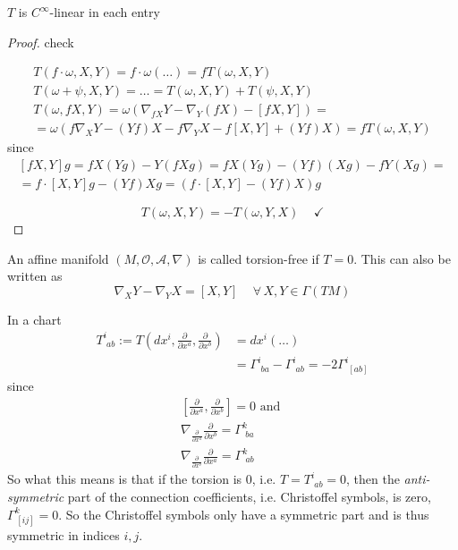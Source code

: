 \begin{theorem}
$T$ is $C^{\infty}$-linear in each entry
\end{theorem}

\begin{proof}
	check 
	
	\[
	\begin{gathered}
		T(f\cdot \omega, X, Y) = f\cdot \omega(\dots) = fT(\omega, X, Y) \\
		T(\omega + \psi, X, Y) = \dots = T(\omega, X, Y) + T(\psi, X, Y) \\
		T(\omega, fX, Y) = \omega( \nabla_{fX} Y - \nabla_Y (fX) - [fX, Y]) = \\
		= \omega(f\nabla_X Y - (Yf)X - f\nabla_Y X - f[X,Y] + (Yf)X) = fT(\omega,X,Y)
	\end{gathered}
	\]
	since
	\[
	\begin{gathered} 
		[fX,Y] g = fX(Yg) - Y(fXg) = fX(Yg) - (Yf) (Xg) - fY(Xg) = \\
		= f\cdot [X,Y] g - (Yf) Xg = (f\cdot [X,Y] - (Yf)X) g
	\end{gathered} 
	\]
	
	\[
	T(\omega, X, Y) = -T(\omega, Y , X)  \quad \, \checkmark
	\]
\end{proof}

\begin{definition}
	An affine manifold $(M, \mathcal{O}, \mathcal{A}, \nabla)$ is called torsion-free if $T=0$. This can also be written as
	\begin{equation}
		\nabla_X Y - \nabla_Y X = [X,Y] \quad \, \forall \, X, Y \in \Gamma(TM)
	\end{equation}	
\end{definition}

In a chart 
\[
\begin{aligned}
	T^i_{ \, \, ab } := T\left(dx^i , \frac{ \partial }{ \partial x^a} , \frac{ \partial }{ \partial x^b}  \right) & = dx^i ( \dots ) \\ 
	& = \Gamma^i_{ \, \, ba} - \Gamma^i_{ \, \, ab} = -2 \Gamma^i_{ \, \, [ab] }
\end{aligned}
\]
since
\[
\begin{gathered}
	[\frac{ \partial }{ \partial x^a}, \frac{ \partial }{ \partial x^b}] = 0 \text{ and } \\
	\nabla_{\frac{ \partial }{ \partial x^a} } \frac{ \partial }{ \partial x^b} = \Gamma^k_{\, \, ba} \\
	\nabla_{\frac{ \partial }{ \partial x^b} } \frac{ \partial }{ \partial x^a} = \Gamma^k_{\, \, ab} 
\end{gathered}\]
So what this means is that if the torsion is $0$, i.e. $T = T^i_{\, \, ab} = 0$, then the \emph{anti-symmetric} part of the connection coefficients, i.e. Christoffel symbols, is zero, $\Gamma^k_{\, [ij]} = 0$. So the Christoffel symbols only have a symmetric part and is thus symmetric in indices $i, j$.

